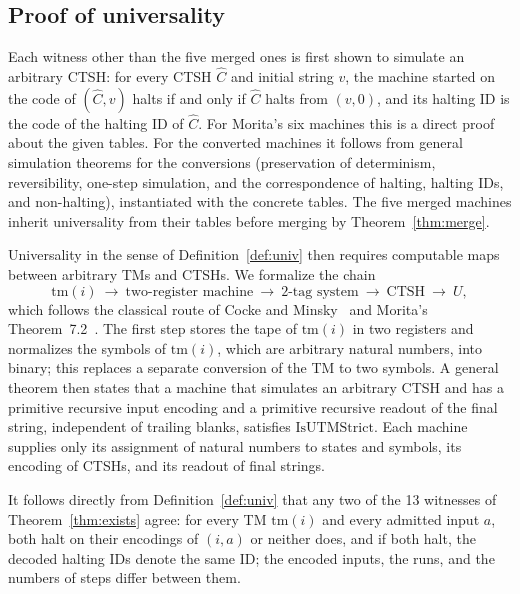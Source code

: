 \documentclass{article}
\theoremstyle{definition}
\theoremstyle{remark}
\begin{document}
\subsection{Proof of universality}

Each witness other than the five merged ones is first shown to simulate an arbitrary CTSH: for every CTSH $\hat C$ and initial string $v$, the machine started on the code of $(\hat C,v)$ halts if and only if $\hat C$ halts from $(v,0)$, and its halting ID is the code of the halting ID of $\hat C$.
For Morita's six machines this is a direct proof about the given tables.
For the converted machines it follows from general simulation theorems for the conversions (preservation of determinism, reversibility, one-step simulation, and the correspondence of halting, halting IDs, and non-halting), instantiated with the concrete tables.
The five merged machines inherit universality from their tables before merging by Theorem~\ref{thm:merge}.

Universality in the sense of Definition~\ref{def:univ} then requires computable maps between arbitrary TMs and CTSHs.
We formalize the chain
\[
  \mathrm{tm}(i)\ \longrightarrow\ \text{two-register machine}\ \longrightarrow\ \text{2-tag system}\ \longrightarrow\ \text{CTSH}\ \longrightarrow\ U,
\]
which follows the classical route of Cocke and Minsky~\cite{CockeMinsky64} and Morita's Theorem~7.2~\cite{Morita17}.
The first step stores the tape of $\mathrm{tm}(i)$ in two registers and normalizes the symbols of $\mathrm{tm}(i)$, which are arbitrary natural numbers, into binary; this replaces a separate conversion of the TM to two symbols.
A general theorem then states that a machine that simulates an arbitrary CTSH and has a primitive recursive input encoding and a primitive recursive readout of the final string, independent of trailing blanks, satisfies $\mathrm{IsUTMStrict}$.
Each machine supplies only its assignment of natural numbers to states and symbols, its encoding of CTSHs, and its readout of final strings.

It follows directly from Definition~\ref{def:univ} that any two of the 13 witnesses of Theorem~\ref{thm:exists} agree: for every TM $\mathrm{tm}(i)$ and every admitted input $a$, both halt on their encodings of $(i,a)$ or neither does, and if both halt, the decoded halting IDs denote the same ID; the encoded inputs, the runs, and the numbers of steps differ between them.
\end{document}

